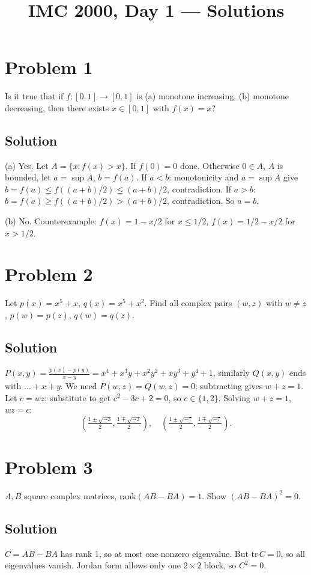 \documentclass{article}
\title{IMC 2000, Day 1 --- Solutions}
\begin{document}
\maketitle

\section*{Problem 1}
Is it true that if $f:[0,1]\to[0,1]$ is (a) monotone increasing, (b) monotone decreasing, then there exists $x\in[0,1]$ with $f(x)=x$?

\subsection*{Solution}
(a) Yes. Let $A=\{x: f(x)>x\}$. If $f(0)=0$ done. Otherwise $0\in A$, $A$ is bounded, let $a=\sup A$, $b=f(a)$. If $a<b$: monotonicity and $a=\sup A$ give $b=f(a)\le f((a+b)/2)\le (a+b)/2$, contradiction. If $a>b$: $b=f(a)\ge f((a+b)/2) > (a+b)/2$, contradiction. So $a=b$.

(b) No. Counterexample: $f(x)=1-x/2$ for $x\le 1/2$, $f(x)=1/2-x/2$ for $x>1/2$.

\section*{Problem 2}
Let $p(x)=x^5+x$, $q(x)=x^5+x^2$. Find all complex pairs $(w,z)$ with $w\ne z$, $p(w)=p(z)$, $q(w)=q(z)$.

\subsection*{Solution}
$P(x,y) = \frac{p(x)-p(y)}{x-y} = x^4+x^3y+x^2y^2+xy^3+y^4+1$, similarly $Q(x,y)$ ends with $\dots+x+y$. We need $P(w,z)=Q(w,z)=0$; subtracting gives $w+z=1$. Let $c=wz$: substitute to get $c^2-3c+2=0$, so $c\in\{1,2\}$. Solving $w+z=1$, $wz=c$:
\[\left(\tfrac{1\pm\sqrt{-3}}{2}, \tfrac{1\mp\sqrt{-3}}{2}\right),\quad \left(\tfrac{1\pm\sqrt{-7}}{2}, \tfrac{1\mp\sqrt{-7}}{2}\right).\]

\section*{Problem 3}
$A,B$ square complex matrices, $\mathrm{rank}(AB-BA)=1$. Show $(AB-BA)^2=0$.

\subsection*{Solution}
$C=AB-BA$ has rank 1, so at most one nonzero eigenvalue. But $\mathrm{tr}\,C=0$, so all eigenvalues vanish. Jordan form allows only one $2\times 2$ block, so $C^2=0$.
\end{document}
